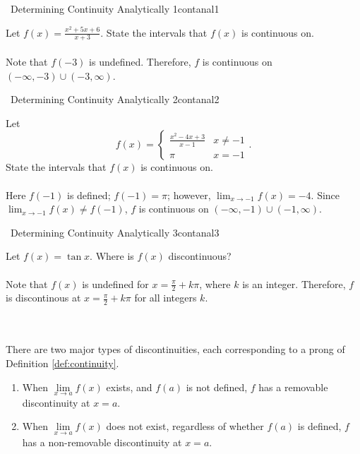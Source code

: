         \begin{example}{\Difficulty\,\Difficulty\,\,Determining Continuity Analytically 1}{contanal1}

            Let \(f(x)=\frac{x^2+5x+6}{x+3}\). State the intervals that \(f(x)\) is continuous on.
            \\
            \\
            Note that \(f(-3)\) is undefined. Therefore, \(f\) is continuous on \((-\infty,-3)\cup(-3,\infty)\).

        \end{example}
        \pagebreak
        \begin{example}{\Difficulty\,\Difficulty\,\,Determining Continuity Analytically 2}{contanal2}

            Let
            \begin{equation*}
                f(x)=\begin{cases}
                    \frac{x^2-4x+3}{x-1} & x\neq -1 \\
                    \pi & x=-1
                \end{cases}.
            \end{equation*}
            State the intervals that \(f(x)\) is continuous on.
            \\
            \\
            Here \(f(-1)\) is defined; \(f(-1)=\pi\); however, \(\lim_{x\to-1}f(x)=-4\). Since \(\lim_{x\to-1}f(x)\neq f(-1)\), \(f\) is continuous on \((-\infty,-1)\cup(-1,\infty)\).

        \end{example}
        \begin{example}{\Difficulty\,\Difficulty\,\,Determining Continuity Analytically 3}{contanal3}

            Let \(f(x)=\tan x\). Where is \(f(x)\) discontinuous?
            \\
            \\
            Note that \(f(x)\) is undefined for \(x=\frac{\pi}{2}+k\pi\), where \(k\) is an integer. Therefore, \(f\) is discontinous at \(x=\frac{\pi}{2}+k\pi\) for all integers \(k\).

        \end{example}
        \vphantom
        \\
        \\
        There are two major types of discontinuities, each corresponding to a prong of Definition \ref{def:continuity}.
        \begin{enumerate}
            \item When \(\lim\limits_{x\to a}f(x)\) exists, and \(f(a)\) is not defined, \(f\) has a removable discontinuity at \(x=a\).
            \item When \(\lim\limits_{x\to a}f(x)\) does not exist, regardless of whether \(f(a)\) is defined, \(f\) has a non-removable discontinuity at \(x=a\).
        \end{enumerate}
